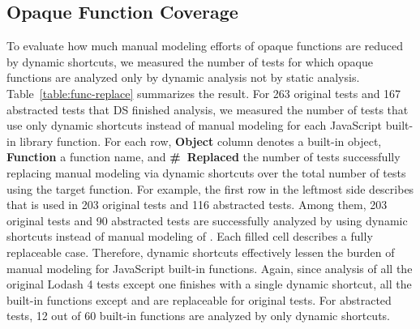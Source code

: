 \subsection{Opaque Function Coverage}
To evaluate how much manual modeling efforts of opaque functions
are reduced by dynamic shortcuts, we measured the number of tests for which
opaque functions are analyzed only by dynamic analysis not by
static analysis.  Table~\ref{table:func-replace} summarizes the result.
For 263 original tests and 167 abstracted tests that DS finished analysis, we measured the
number of tests that use only dynamic shortcuts instead of manual modeling
for each JavaScript built-in library function.  For each row,
\textbf{Object} column denotes a built-in object, \textbf{Function} a function
name, and \textbf{\#~Replaced} the number of tests successfully replacing manual
modeling via dynamic shortcuts over the total number of tests using the target function.
For example, the first row in the leftmost side describes that  is used in
203 original tests and 116 abstracted tests.  Among them, 203 original
tests and 90 abstracted tests are successfully analyzed by using dynamic shortcuts
instead of manual modeling of .  Each filled cell describes
a fully replaceable case.  Therefore, dynamic
shortcuts effectively lessen the burden of manual modeling for JavaScript
built-in functions.  Again, since analysis of all the original Lodash 4 tests except one
finishes with a single dynamic shortcut, all the built-in functions
except  and  are replaceable
for original tests.  For abstracted tests, 12 out of 60 built-in
functions are analyzed by only dynamic shortcuts.
